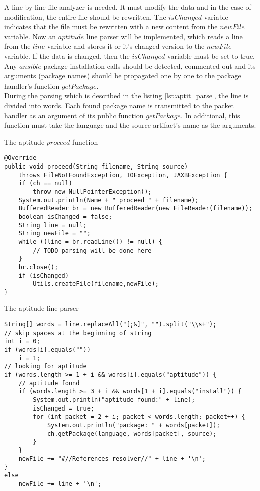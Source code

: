 A line-by-line file analyzer is needed.
It must modify the data and in the case of modification, the entire file should be rewritten.
The $isChanged$ variable indicates that the file must be rewritten with a new content from the $newFile$ variable.
Now an $aptitude$ line parser will be implemented, which reads a line from the $line$ variable and stores it or it's changed version to the $newFile$ variable.
If the data is changed, then the $isChanged$ variable must be set to true.
Any $ansible$ package installation calls should be detected, commented out and its arguments (package names) should be propagated one by one to the package handler's function $getPackage$.\\
During the parsing which is described in the listing \ref{lst:aptit_parse}, the line is divided into words. 
Each found package name is transmitted to the packet handler as an argument of its public function $getPackage$.
In additional, this function must take the language and the source artifact's name as the arguments.
\begin{Listing} 
\caption{The aptitude $proceed$ function}
\label{lst:aptit_proceed}
\begin{lstlisting}
@Override
public void proceed(String filename, String source)
	throws FileNotFoundException, IOException, JAXBException {
	if (ch == null)
		throw new NullPointerException();
	System.out.println(Name + " proceed " + filename);
	BufferedReader br = new BufferedReader(new FileReader(filename));
	boolean isChanged = false;
	String line = null;
	String newFile = "";
	while ((line = br.readLine()) != null) {
		// TODO parsing will be done here
	}
	br.close();
	if (isChanged)
		Utils.createFile(filename,newFile);
}	 
\end{lstlisting}
\end{Listing} 
\begin{Listing} 
\caption{The aptitude line parser}
\label{lst:aptit_parse}
\begin{lstlisting}
String[] words = line.replaceAll("[;&]", "").split("\\s+");
// skip spaces at the beginning of string
int i = 0;
if (words[i].equals(""))
	i = 1;
// looking for aptitude 
if (words.length >= 1 + i && words[i].equals("aptitude")) {
	// aptitude found
	if (words.length >= 3 + i && words[1 + i].equals("install")) {
		System.out.println("aptitude found:" + line);
		isChanged = true;
		for (int packet = 2 + i; packet < words.length; packet++) {
			System.out.println("package: " + words[packet]);
			ch.getPackage(language, words[packet], source);
		}
	}
	newFile += "#//References resolver//" + line + '\n';
} 
else
	newFile += line + '\n';
\end{lstlisting}
\end{Listing} 
